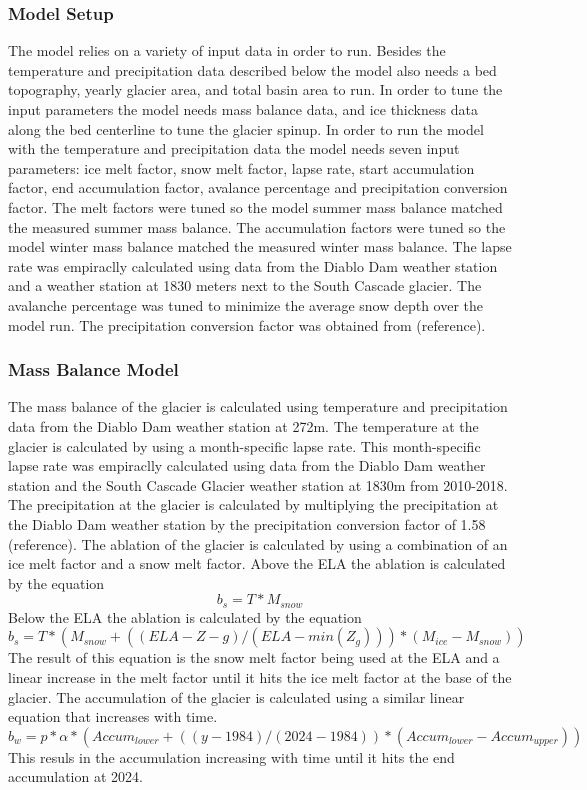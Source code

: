 \documentclass{article}
\begin{document}
\subsubsection{Model Setup}
The model relies on a variety of input data in order to run. Besides the temperature and precipitation data described below the model also 
needs a bed topography, yearly glacier area, and total basin area to run. In order to tune the input parameters the model needs mass balance 
data, and ice thickness data along the bed centerline to tune the glacier spinup. In order to run the model with the temperature and 
precipitation data the model needs seven input parameters: ice melt factor, snow melt factor, lapse rate, start accumulation factor, end 
accumulation factor, avalance percentage and precipitation conversion factor. The melt factors were tuned so the model summer mass balance 
matched the measured summer mass balance. The accumulation factors were tuned so the model winter mass balance matched the measured winter 
mass balance. The lapse rate was empiraclly calculated using data from the Diablo Dam weather station and a weather station at 1830 meters 
next to the South Cascade glacier. The avalanche percentage was tuned to minimize the average snow depth over the model run. The precipitation 
conversion factor was obtained from (reference).

\subsubsection{Mass Balance Model}
The mass balance of the glacier is calculated using temperature and precipitation data from the Diablo Dam weather station at 272m. The 
temperature at the glacier is calculated by using a month-specific lapse rate. This month-specific lapse rate was empiraclly calculated using
data from the Diablo Dam weather station and the South Cascade Glacier weather station at 1830m from 2010-2018. The precipitation at the 
glacier is calculated by multiplying the precipitation at the Diablo Dam weather station by the precipitation conversion factor of 1.58 
(reference). The ablation of the glacier is calculated by using a combination of an ice melt factor and a snow melt factor. Above the ELA the 
ablation is calculated by the equation
\begin{equation}b_s=T*M_{snow}\end{equation}
Below the ELA the ablation is calculated by the equation
\begin{equation}b_s=T*(M_{snow}+((ELA-Z-g)/(ELA-min(Z_g)))*(M_{ice}-M_{snow}))\end{equation}
The result of this equation is the snow melt factor being used at the ELA and a linear increase in the melt factor until it hits the ice melt 
factor at the base of the glacier. 
The accumulation of the glacier is calculated using a similar linear equation that increases with time.
\begin{equation}b_w=p*\alpha*({Accum}_{lower}+((y-1984)/(2024-1984))*({Accum}_{lower}-{Accum}_{upper}))\end{equation}
This resuls in the accumulation increasing with time until it hits the end accumulation at 2024. 
\end{document}
